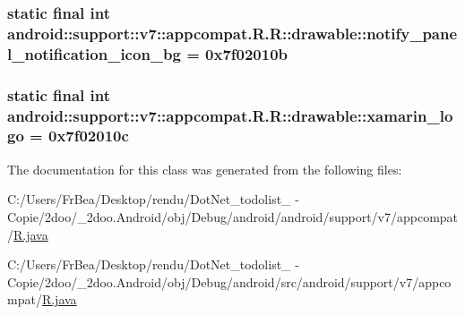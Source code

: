 \hypertarget{classandroid_1_1support_1_1v7_1_1appcompat_1_1_r_1_1drawable_5b83e29290a56926030fccee04e7cb71}{
\subsubsection[{notify\_\-panel\_\-notification\_\-icon\_\-bg}]{\setlength{\rightskip}{0pt plus 5cm}static final int android::support::v7::appcompat.R.R::drawable::notify\_\-panel\_\-notification\_\-icon\_\-bg = 0x7f02010b}}
\label{classandroid_1_1support_1_1v7_1_1appcompat_1_1_r_1_1drawable_5b83e29290a56926030fccee04e7cb71}


\hypertarget{classandroid_1_1support_1_1v7_1_1appcompat_1_1_r_1_1drawable_569c73695a3171fc8427cb40cbd63b86}{
\subsubsection[{xamarin\_\-logo}]{\setlength{\rightskip}{0pt plus 5cm}static final int android::support::v7::appcompat.R.R::drawable::xamarin\_\-logo = 0x7f02010c}}
\label{classandroid_1_1support_1_1v7_1_1appcompat_1_1_r_1_1drawable_569c73695a3171fc8427cb40cbd63b86}




The documentation for this class was generated from the following files:\begin{CompactItemize}
\item 
C:/Users/FrBea/Desktop/rendu/DotNet\_\-todolist\_ - Copie/2doo/\_\-2doo.Android/obj/Debug/android/android/support/v7/appcompat/\hyperlink{android_2support_2v7_2appcompat_2_r_8java}{R.java}\item 
C:/Users/FrBea/Desktop/rendu/DotNet\_\-todolist\_ - Copie/2doo/\_\-2doo.Android/obj/Debug/android/src/android/support/v7/appcompat/\hyperlink{src_2android_2support_2v7_2appcompat_2_r_8java}{R.java}\end{CompactItemize}
